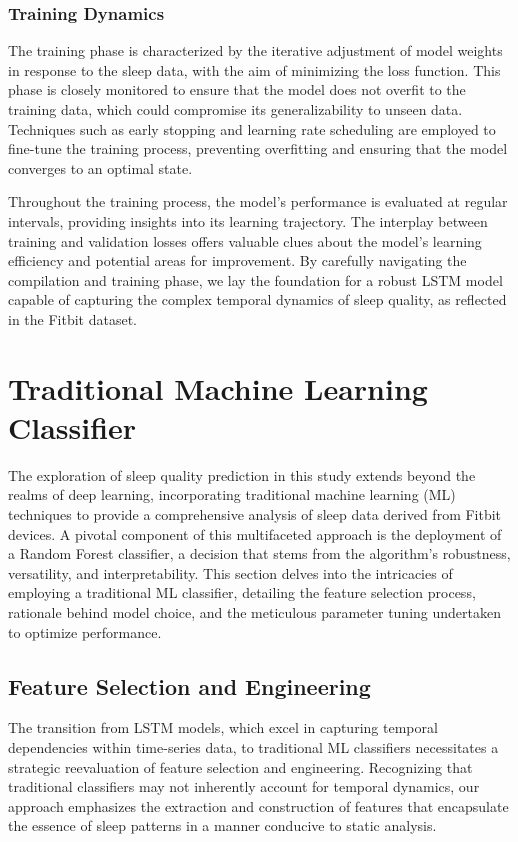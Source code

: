 \documentclass[10pt]{extarticle}
\begin{document}
\subsubsection{Training Dynamics}

The training phase is characterized by the iterative adjustment of model weights in response to the sleep data, with the aim of minimizing the loss function. This phase is closely monitored to ensure that the model does not overfit to the training data, which could compromise its generalizability to unseen data. Techniques such as early stopping and learning rate scheduling are employed to fine-tune the training process, preventing overfitting and ensuring that the model converges to an optimal state.

Throughout the training process, the model's performance is evaluated at regular intervals, providing insights into its learning trajectory. The interplay between training and validation losses offers valuable clues about the model's learning efficiency and potential areas for improvement. By carefully navigating the compilation and training phase, we lay the foundation for a robust LSTM model capable of capturing the complex temporal dynamics of sleep quality, as reflected in the Fitbit dataset.

\section{Traditional Machine Learning Classifier}

The exploration of sleep quality prediction in this study extends beyond the realms of deep learning, incorporating traditional machine learning (ML) techniques to provide a comprehensive analysis of sleep data derived from Fitbit devices. A pivotal component of this multifaceted approach is the deployment of a Random Forest classifier, a decision that stems from the algorithm's robustness, versatility, and interpretability. This section delves into the intricacies of employing a traditional ML classifier, detailing the feature selection process, rationale behind model choice, and the meticulous parameter tuning undertaken to optimize performance.

\subsection{Feature Selection and Engineering}

The transition from LSTM models, which excel in capturing temporal dependencies within time-series data, to traditional ML classifiers necessitates a strategic reevaluation of feature selection and engineering. Recognizing that traditional classifiers may not inherently account for temporal dynamics, our approach emphasizes the extraction and construction of features that encapsulate the essence of sleep patterns in a manner conducive to static analysis.
\end{document}
